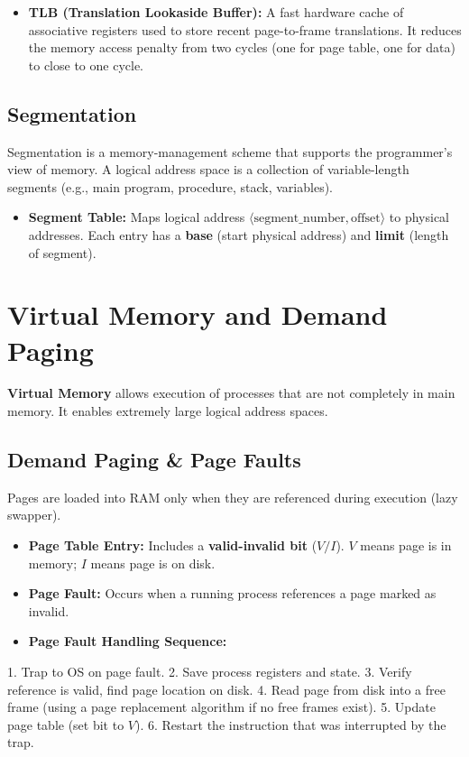 \documentclass[12pt,a4paper]{article}
\begin{document}
\begin{itemize}[leftmargin=*, itemsep=3pt]
  \item \textbf{TLB (Translation Lookaside Buffer):} A fast hardware cache of associative registers used to store recent page-to-frame translations. It reduces the memory access penalty from two cycles (one for page table, one for data) to close to one cycle.
\end{itemize}

\subsection{Segmentation}
Segmentation is a memory-management scheme that supports the programmer's view of memory. A logical address space is a collection of variable-length segments (e.g., main program, procedure, stack, variables).
\begin{itemize}[leftmargin=*, itemsep=3pt]
  \item \textbf{Segment Table:} Maps logical address $\langle \text{segment\_number}, \text{offset} \rangle$ to physical addresses. Each entry has a \textbf{base} (start physical address) and \textbf{limit} (length of segment).
\end{itemize}

\section{Virtual Memory and Demand Paging}

\textbf{Virtual Memory} allows execution of processes that are not completely in main memory. It enables extremely large logical address spaces.

\subsection{Demand Paging \& Page Faults}
Pages are loaded into RAM only when they are referenced during execution (lazy swapper).
\begin{itemize}[leftmargin=*, itemsep=3pt]
  \item \textbf{Page Table Entry:} Includes a \textbf{valid-invalid bit} ($V/I$). $V$ means page is in memory; $I$ means page is on disk.
  \item \textbf{Page Fault:} Occurs when a running process references a page marked as invalid.
  \item \textbf{Page Fault Handling Sequence:}
\end{itemize}
  1. Trap to OS on page fault.
  2. Save process registers and state.
  3. Verify reference is valid, find page location on disk.
  4. Read page from disk into a free frame (using a page replacement algorithm if no free frames exist).
  5. Update page table (set bit to $V$).
  6. Restart the instruction that was interrupted by the trap.
\end{document}
